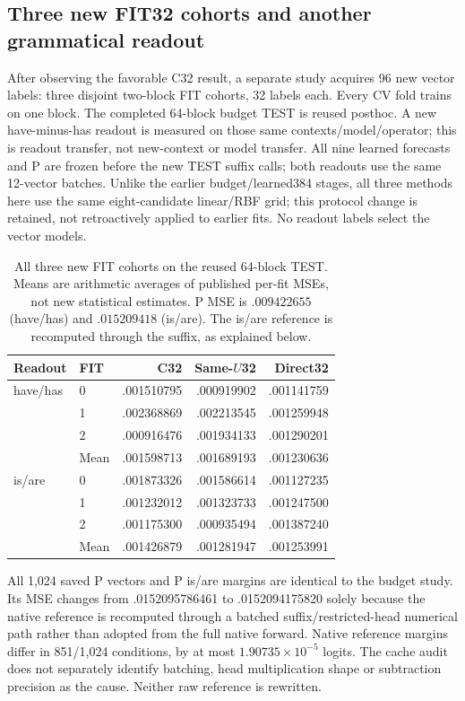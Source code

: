 \subsection{Three new FIT32 cohorts and another grammatical readout}\label{sec:transfer32}
After observing the favorable C32 result, a separate study acquires 96 new vector labels: three disjoint two-block FIT cohorts, 32 labels each. Every CV fold trains on one block. The completed 64-block budget TEST is reused posthoc. A new have-minus-has readout is measured on those same contexts/model/operator; this is readout transfer, not new-context or model transfer. All nine learned forecasts and P are frozen before the new TEST suffix calls; both readouts use the same 12-vector batches. Unlike the earlier budget/learned384 stages, all three methods here use the same eight-candidate linear/RBF grid; this protocol change is retained, not retroactively applied to earlier fits. No readout labels select the vector models.

\begin{table}[ht]\centering\small
\begin{tabular}{llrrr}\toprule Readout & FIT & C32 & Same-$U$32 & Direct32\\\midrule
have/has & 0 & .001510795 & .000919902 & .001141759\\
 & 1 & .002368869 & .002213545 & .001259948\\
 & 2 & .000916476 & .001934133 & .001290201\\
 & Mean & .001598713 & .001689193 & .001230636\\\midrule
is/are & 0 & .001873326 & .001586614 & .001127235\\
 & 1 & .001232012 & .001323733 & .001247500\\
 & 2 & .001175300 & .000935494 & .001387240\\
 & Mean & .001426879 & .001281947 & .001253991\\\bottomrule
\end{tabular}
\caption{All three new FIT cohorts on the reused 64-block TEST. Means are arithmetic averages of published per-fit MSEs, not new statistical estimates. P MSE is $.009422655$ (have/has) and $.015209418$ (is/are). The is/are reference is recomputed through the suffix, as explained below.}\label{tab:transfer32}
\end{table}
All 1,024 saved P vectors and P is/are margins are identical to the budget study. Its MSE changes from .0152095786461 to .0152094175820 solely because the native reference is recomputed through a batched suffix/restricted-head numerical path rather than adopted from the full native forward. Native reference margins differ in 851/1,024 conditions, by at most $1.90735\times10^{-5}$ logits. The cache audit does not separately identify batching, head multiplication shape or subtraction precision as the cause. Neither raw reference is rewritten.

